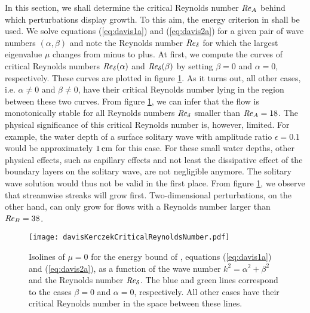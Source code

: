 \documentclass{jfm}
\newcommand\Rey{\mbox{\textit{Re}}}  %
\begin{document}
In this section, 
we shall determine the critical Reynolds number $ \Rey_A $ 
behind which perturbations display growth. To this aim,
the energy criterion in \citet{DavisKerczek1973}
shall be used. We solve 
equations (\ref{eq:davis1a}) and (\ref{eq:davis2a}) for a given
pair of wave numbers $ (\alpha,\beta) $ and note the Reynolds number
$ \Rey_\delta $ for which the largest eigenvalue $ \mu $ changes from
minus to plus. At first, we compute the curves  of critical Reynolds numbers
$ \Rey_\delta(\alpha) $ and $ \Rey_\delta(\beta) $ by setting
$ \beta = 0 $ and $ \alpha = 0 $, respectively. These
curves are plotted in figure \ref{fig:davisKerczek}. 
As it turns out, all other cases, i.e. $ \alpha \neq 0 $ and $ \beta \neq 0 $,
have their critical Reynolds number lying in the region
between these two curves. From figure \ref{fig:davisKerczek}, we
can infer that the flow is monotonically stable for all Reynolds numbers
$ \Rey_\delta $ smaller than $ \Rey_A = 18 $. The physical significance
of this critical Reynolds number is, however, limited. For
example, the water depth of a surface solitary wave with
amplitude ratio $ \epsilon = 0.1 $ would be approximately $ 1 \, {\rm cm} $ for this case. For these small water depths, other physical effects,
such as capillary effects and not least the dissipative effect of the
boundary layers on the solitary wave, are not negligible anymore.
The solitary wave solution would thus not be valid in the first place.
From figure 
\ref{fig:davisKerczek}, we observe that streamwise streaks
will grow first. Two-dimensional perturbations, on the other hand,
can only grow for flows with a Reynolds number larger than $ \Rey_B = 38 $. 

\begin{figure}
  \centering
    \texttt{[image: davisKerczekCriticalReynoldsNumber.pdf]}
    \caption{Isolines of $ \mu = 0 $ for the energy bound of \citet{DavisKerczek1973}, equations (\ref{eq:davis1a}) and (\ref{eq:davis2a}), as a function of
      the wave number $ k^2 = \alpha^2 + \beta^2 $ and the Reynolds number $ \Rey_\delta $. The blue and green lines correspond to the cases $ \beta = 0 $ and
$ \alpha = 0 $, respectively. All other cases have their critical Reynolds
number in the space between these lines.  }
    \label{fig:davisKerczek}
\end{figure}
\end{document}
